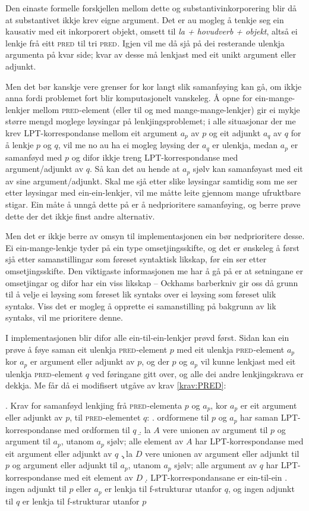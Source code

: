 \documentclass[11pt,a4paper,oneside,draft]{book}
\newcommand{\F}[2]{\textsc{#1}\ensuremath{_{#2}}}
\newcommand{\PRED}{\F{pred}{}}
\begin{document}
Den einaste formelle forskjellen mellom dette og
substantivinkorporering blir då at substantivet ikkje krev eigne
argument. Det er au mogleg å tenkje seg ein kausativ med eit
inkorporert objekt, omsett til \emph{la + hovudverb + objekt}, altså ei
lenkje frå eitt \PRED{} til tri \PRED{}. Igjen vil me då sjå på dei resterande
ulenkja argumenta på kvar side; kvar av desse må lenkjast med eit
unikt argument eller adjunkt.

Men det bør kanskje vere grenser for kor langt slik samanføying kan
gå, om ikkje anna fordi problemet fort blir komputasjonelt
vanskeleg. Å opne for ein-mange-lenkjer mellom \PRED{}-element (eller til
og med mange-mange-lenkjer) gir ei mykje større mengd moglege
løysingar på lenkjingsproblemet; i alle situasjonar der me krev
LPT-korrespondanse mellom eit argument $a_p$ av $p$ og eit adjunkt
$a_q$ av $q$ for å lenkje $p$ og $q$, vil me no au ha ei mogleg
løysing der $a_q$ er ulenkja, medan $a_p$ er samanføyd med $p$ og
difor ikkje treng LPT-korrespondanse med argument/adjunkt av $q$. Så
kan det au hende at $a_p$ sjølv kan samanføyast med eit av sine
argument/adjunkt. Skal me sjå etter slike løysingar samtidig som me
ser etter løysingar med ein-ein-lenkjer, vil me måtte leite gjennom
mange ufruktbare stigar. Ein måte å unngå dette på er å nedprioritere
samanføying, og berre prøve dette der det ikkje finst andre
alternativ.

Men det er ikkje berre av omsyn til implementasjonen ein bør
nedprioritere desse. Ei ein-mange-lenkje tyder på ein type
omsetjingsskifte, og det er ønskeleg å først sjå etter samanstillingar
som føreset syntaktisk likskap, før ein ser etter
omsetjingsskifte. Den viktigaste informasjonen me har å gå på er at
setningane er omsetjingar og difor har ein viss likskap -- Ockhams
barberkniv gir oss då grunn til å velje ei løysing som føreset lik
syntaks over ei løysing som føreset ulik syntaks. Viss det er mogleg å
opprette ei samanstilling på bakgrunn av lik syntaks, vil me
prioritere denne.

I implementasjonen blir difor alle ein-til-ein-lenkjer prøvd
først. Sidan kan ein prøve å føye saman eit ulenkja \PRED{}-element
$p$ med eit ulenkja \PRED{}-element $a_p$ kor $a_p$ er argument eller
adjunkt av $p$, og der $p$ og $a_p$ vil kunne lenkjast med eit ulenkja
\PRED{}-element $q$ ved føringane gitt over, og alle dei andre
lenkjingskrava er dekkja. Me får då ei modifisert utgåve av krav
\ref{krav:PRED}:

\ex. \label{krav:f-ein-mange} Krav for samanføyd lenkjing frå \PRED{}-elementa
$p$ og $a_p$, kor $a_p$ er eit argument eller adjunkt av $p$, til \PRED{}-elementet $q$:
\a. ordformene til $p$ og $a_p$ har saman LPT-korrespondanse med ordformen til $q$
\b. la $A$ vere unionen av argument til $p$ og argument til $a_p$,
    utanom $a_p$ sjølv;
    alle element av $A$ har LPT-korrespondanse med eit argument eller adjunkt av $q$
\c. la $D$ vere unionen av argument eller adjunkt til $p$ og argument
    eller adjunkt til $a_p$, utanom $a_p$ sjølv;
    alle argument av $q$ har LPT-korrespondanse med eit element av $D$
\d. LPT-korrespondansane er ein-til-ein
\e. ingen adjunkt til $p$ eller $a_p$ er lenkja til f-strukturar utanfor $q$, og ingen
    adjunkt til $q$ er lenkja til f-strukturar utanfor $p$
\end{document}
